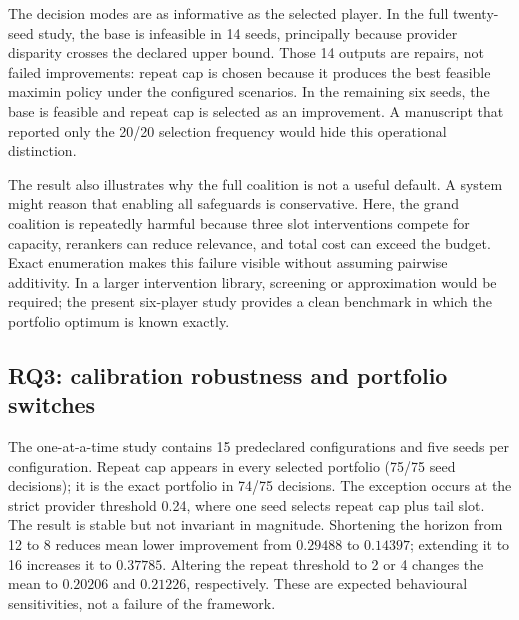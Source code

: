 \documentclass[pdflatex,sn-mathphys-num]{sn-jnl}
\theoremstyle{thmstyleone}
\theoremstyle{thmstyletwo}
\theoremstyle{thmstylethree}
\begin{document}
The decision modes are as informative as the selected player. In the full twenty-seed study, the base is infeasible in 14 seeds, principally because provider disparity crosses the declared upper bound. Those 14 outputs are repairs, not failed improvements: repeat cap is chosen because it produces the best feasible maximin policy under the configured scenarios. In the remaining six seeds, the base is feasible and repeat cap is selected as an improvement. A manuscript that reported only the 20/20 selection frequency would hide this operational distinction.

The result also illustrates why the full coalition is not a useful default. A system might reason that enabling all safeguards is conservative. Here, the grand coalition is repeatedly harmful because three slot interventions compete for capacity, rerankers can reduce relevance, and total cost can exceed the budget. Exact enumeration makes this failure visible without assuming pairwise additivity. In a larger intervention library, screening or approximation would be required; the present six-player study provides a clean benchmark in which the portfolio optimum is known exactly.

\subsection{RQ3: calibration robustness and portfolio switches}\label{sec:rq3}

The one-at-a-time study contains 15 predeclared configurations and five seeds per configuration. Repeat cap appears in every selected portfolio (75/75 seed decisions); it is the exact portfolio in 74/75 decisions. The exception occurs at the strict provider threshold 0.24, where one seed selects repeat cap plus tail slot. The result is stable but not invariant in magnitude. Shortening the horizon from 12 to 8 reduces mean lower improvement from $0.29488$ to $0.14397$; extending it to 16 increases it to $0.37785$. Altering the repeat threshold to 2 or 4 changes the mean to $0.20206$ and $0.21226$, respectively. These are expected behavioural sensitivities, not a failure of the framework.
\end{document}
